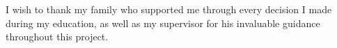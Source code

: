 
\begin{dedication}

I wish to thank my family who supported me through every decision I made during
my education, as well as my supervisor for his invaluable guidance throughout
this project.
\end{dedication}


